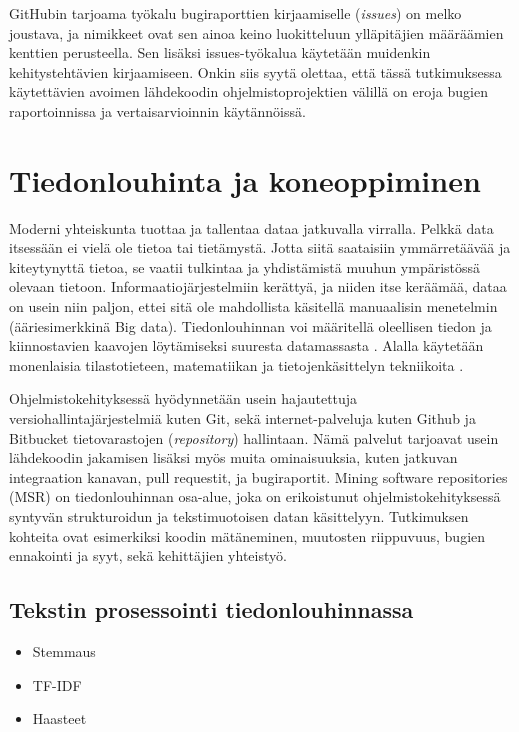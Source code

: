 \documentclass[utf8]{gradu3}
\begin{document}
GitHubin tarjoama työkalu bugiraporttien kirjaamiselle (\textit{issues}) on
melko joustava, ja nimikkeet ovat sen ainoa keino luokitteluun ylläpitäjien
määräämien kenttien perusteella. Sen lisäksi issues-työkalua käytetään muidenkin
kehitystehtävien kirjaamiseen.  Onkin siis syytä olettaa, että tässä
tutkimuksessa käytettävien avoimen lähdekoodin ohjelmistoprojektien välillä on
eroja bugien raportoinnissa ja vertaisarvioinnin käytännöissä.
  
\chapter{Tiedonlouhinta ja koneoppiminen}

Moderni yhteiskunta tuottaa ja tallentaa dataa jatkuvalla virralla. Pelkkä data
itsessään ei vielä ole tietoa tai tietämystä. Jotta siitä saataisiin
ymmärretäävää ja kiteytynyttä tietoa, se vaatii tulkintaa ja yhdistämistä muuhun
ympäristössä olevaan tietoon. %
Informaatiojärjestelmiin kerättyä, ja niiden itse keräämää, dataa on usein niin
paljon, ettei sitä ole mahdollista käsitellä manuaalisin menetelmin
(ääriesimerkkinä Big data). Tiedonlouhinnan voi määritellä oleellisen tiedon ja
kiinnostavien kaavojen löytämiseksi suuresta datamassasta
\parencite[][8]{han-data_mining}. Alalla käytetään monenlaisia tilastotieteen,
matematiikan ja tietojenkäsittelyn tekniikoita \parencite{clifton-2019}. 

Ohjelmistokehityksessä hyödynnetään usein hajautettuja
versiohallintajärjestelmiä kuten Git, sekä internet-palveluja kuten Github ja
Bitbucket tietovarastojen (\textit{repository}) hallintaan. Nämä palvelut
tarjoavat usein lähdekoodin jakamisen lisäksi myös muita ominaisuuksia, kuten
jatkuvan integraation kanavan, pull requestit, ja bugiraportit. Mining software
repositories (MSR) on tiedonlouhinnan osa-alue, joka on erikoistunut
ohjelmistokehityksessä syntyvän strukturoidun ja tekstimuotoisen datan
käsittelyyn. Tutkimuksen kohteita ovat esimerkiksi koodin mätäneminen, muutosten
riippuvuus, bugien ennakointi ja syyt, sekä kehittäjien yhteistyö.
\parencite{guemes-pena-emerging_topics}

\section{Tekstin prosessointi tiedonlouhinnassa}
 \begin{itemize}
   \item Stemmaus
   \item TF-IDF
   \item Haasteet
 \end{itemize}
\end{document}
